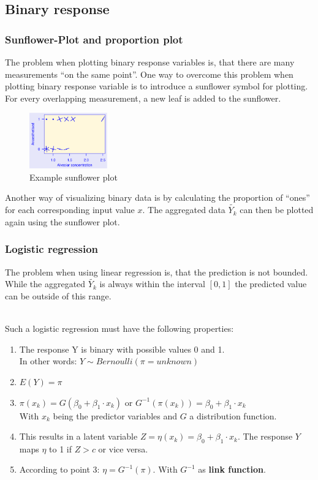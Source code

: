 \subsection{Binary response}

\subsubsection{Sunflower-Plot and proportion plot}

The problem when plotting binary response variables is, that there are many measurements ``on the same point''. One way to overcome this problem when plotting binary response variable is to introduce a sunflower symbol for plotting. For every overlapping measurement, a new leaf is added to the sunflower.
\begin{figure}[H]
	\centering
	\includegraphics[width=0.3\textwidth]{images/sunflower.png}
	\caption{Example sunflower plot}
\end{figure}

Another way of visualizing binary data is by calculating the proportion of ``ones'' for each corresponding input value $x$. The aggregated data $\tilde{Y_k}$ can then be plotted again using the sunflower plot.

\subsubsection{Logistic regression}

The problem when using linear regression is, that the prediction is not bounded. While the aggregated $\tilde{Y_k}$ is always within the interval $[0, 1]$ the predicted value can be outside of this range.

\mbox{}\\
Such a logistic regression must have the following properties:
\begin{enumerate}
	\tightlist
	\item The response Y is binary with possible values 0 and 1.\\
	In other words: $Y \sim Bernoulli(\pi=unknown)$
	\item $E(Y) = \pi$
	\item $\pi(x_k) = G(\beta_0 + \beta_1 \cdot x_k)$ or $G^{-1}(\pi(x_k)) = \beta_0 + \beta_1 \cdot x_k$\\
	With $x_k$ being the predictor variables and $G$ a distribution function.
	\item This results in a latent variable $Z =\eta(x_k) = \beta_0 + \beta_1 \cdot x_k$. The response $Y$ maps $\eta$ to 1 if $Z > c$ or vice versa.
	\item According to point 3: $\eta = G^{-1}(\pi)$. With $G^{-1}$ as \textbf{link function}.
\end{enumerate}


